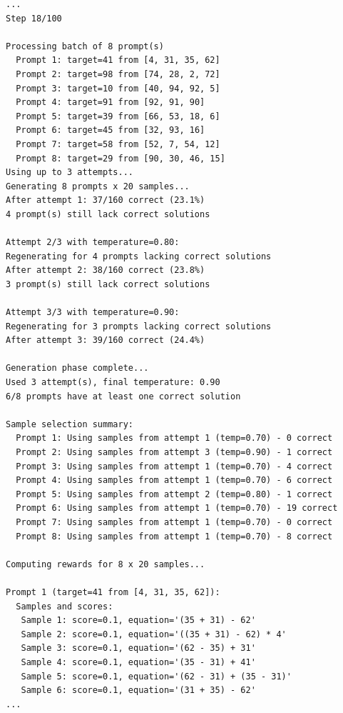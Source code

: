 \documentclass{article}
\begin{document}
\begin{lstlisting}[basicstyle=\tiny\ttfamily]
...
Step 18/100

Processing batch of 8 prompt(s)
  Prompt 1: target=41 from [4, 31, 35, 62]
  Prompt 2: target=98 from [74, 28, 2, 72]
  Prompt 3: target=10 from [40, 94, 92, 5]
  Prompt 4: target=91 from [92, 91, 90]
  Prompt 5: target=39 from [66, 53, 18, 6]
  Prompt 6: target=45 from [32, 93, 16]
  Prompt 7: target=58 from [52, 7, 54, 12]
  Prompt 8: target=29 from [90, 30, 46, 15]
Using up to 3 attempts...
Generating 8 prompts x 20 samples...
After attempt 1: 37/160 correct (23.1%)
4 prompt(s) still lack correct solutions

Attempt 2/3 with temperature=0.80:
Regenerating for 4 prompts lacking correct solutions
After attempt 2: 38/160 correct (23.8%)
3 prompt(s) still lack correct solutions

Attempt 3/3 with temperature=0.90:
Regenerating for 3 prompts lacking correct solutions
After attempt 3: 39/160 correct (24.4%)

Generation phase complete...
Used 3 attempt(s), final temperature: 0.90
6/8 prompts have at least one correct solution

Sample selection summary:
  Prompt 1: Using samples from attempt 1 (temp=0.70) - 0 correct
  Prompt 2: Using samples from attempt 3 (temp=0.90) - 1 correct
  Prompt 3: Using samples from attempt 1 (temp=0.70) - 4 correct
  Prompt 4: Using samples from attempt 1 (temp=0.70) - 6 correct
  Prompt 5: Using samples from attempt 2 (temp=0.80) - 1 correct
  Prompt 6: Using samples from attempt 1 (temp=0.70) - 19 correct
  Prompt 7: Using samples from attempt 1 (temp=0.70) - 0 correct
  Prompt 8: Using samples from attempt 1 (temp=0.70) - 8 correct

Computing rewards for 8 x 20 samples...

Prompt 1 (target=41 from [4, 31, 35, 62]):
  Samples and scores:
   Sample 1: score=0.1, equation='(35 + 31) - 62'
   Sample 2: score=0.1, equation='((35 + 31) - 62) * 4'
   Sample 3: score=0.1, equation='(62 - 35) + 31'
   Sample 4: score=0.1, equation='(35 - 31) + 41'
   Sample 5: score=0.1, equation='(62 - 31) + (35 - 31)'
   Sample 6: score=0.1, equation='(31 + 35) - 62'
...
\end{lstlisting}
\end{document}
